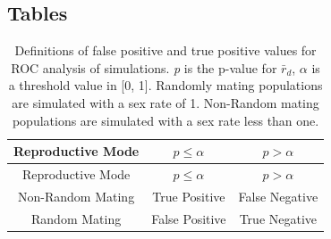 \documentclass[]{article}
\theoremstyle{definition}
\theoremstyle{definition}
\theoremstyle{remark}
\begin{document}
\newpage

\subsection{Tables}\label{tables}

\begin{longtable}[]{@{}ccc@{}}
\caption{\label{tab:simtab1} Definitions of false positive and true positive
values for ROC analysis of simulations. \emph{p} is the p-value for
\(\bar{r}_d\), \(\alpha\) is a threshold value in {[}0, 1{]}. Randomly
mating populations are simulated with a sex rate of 1. Non-Random mating
populations are simulated with a sex rate less than one.}\tabularnewline
\toprule
Reproductive Mode & \(p \leq \alpha\) & \(p > \alpha\)\tabularnewline
\midrule
\endfirsthead
\toprule
Reproductive Mode & \(p \leq \alpha\) & \(p > \alpha\)\tabularnewline
\midrule
\endhead
Non-Random Mating & True Positive & False Negative\tabularnewline
Random Mating & False Positive & True Negative\tabularnewline
\bottomrule
\end{longtable}
\end{document}
